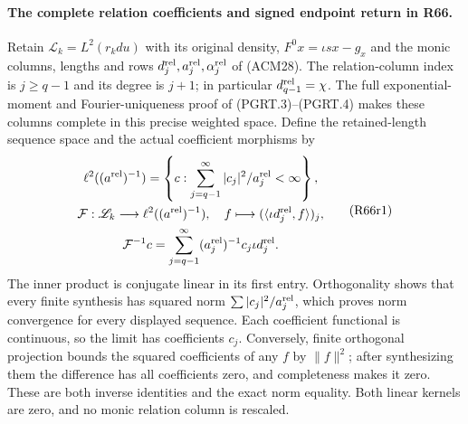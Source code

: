 \paragraph{The complete relation coefficients and signed endpoint return in R66.}
Retain $\mathscr L_k=L^2(r_kdu)$ with its original density,
$F^0x=\iota sx-g_x$ and the monic columns, lengths and rows
$d_j^{\rm rel},a_j^{\rm rel},\alpha_j^{\rm rel}$ of (ACM28).
The relation-column index is $j\geq q-1$ and its degree is
$j+1$; in particular $d_{q-1}^{\rm rel}=\chi$.
The full exponential-moment and Fourier-uniqueness proof of
(PGRT.3)--(PGRT.4) makes these columns complete in this precise
weighted space. Define the retained-length sequence space and
the actual coefficient morphisms by
\[
\begin{gathered}
 \ell^2((a^{\rm rel})^{-1})=
 \left\{c:\sum_{j=q-1}^{\infty}|c_j|^2/a_j^{\rm rel}<\infty\right\},\\
 \mathcal F:\mathscr L_k\longrightarrow\ell^2((a^{\rm rel})^{-1}),
 \quad f\longmapsto(\langle\iota d_j^{\rm rel},f\rangle)_j,\\
 \mathcal F^{-1}c=\sum_{j=q-1}^{\infty}
                   (a_j^{\rm rel})^{-1}c_j\iota d_j^{\rm rel}.
\end{gathered}\tag{R66r1}
\]
The inner product is conjugate linear in its first entry.
Orthogonality shows that every finite synthesis has squared norm
$\sum|c_j|^2/a_j^{\rm rel}$, which proves norm convergence for
every displayed sequence. Each coefficient functional is continuous,
so the limit has coefficients $c_j$. Conversely, finite orthogonal
projection bounds the squared coefficients of any $f$ by
$\|f\|^2$; after synthesizing them the difference has all
coefficients zero, and completeness makes it zero. These are
both inverse identities and the exact norm equality. Both
linear kernels are zero, and no monic relation column is rescaled.

